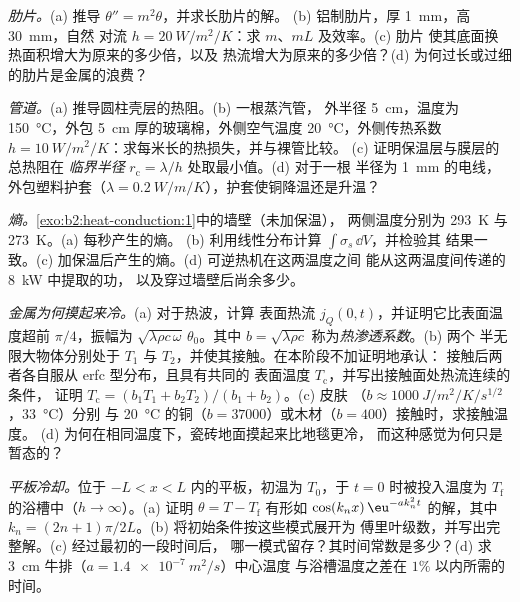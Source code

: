 \begin{exercise}[$\star\star$]\label{exo:b2:heat-conduction:8}
\emph{肋片。}(a) 推导 $\theta'' = m^2\theta$，并求长肋片的解。
(b) 铝制肋片，厚 \qty{1}{mm}，高 \qty{30}{mm}，自然
对流 $h = \qty{20}{W/m^2/K}$：求 $m$、$mL$ 及效率。(c) 肋片
使其底面换热面积增大为原来的多少倍，以及
热流增大为原来的多少倍？(d) 为何过长或过细的肋片是金属的浪费？
\end{exercise}

\begin{exercise}[$\star\star$]\label{exo:b2:heat-conduction:9}
\emph{管道。}(a) 推导圆柱壳层的热阻。(b) 一根蒸汽管，
外半径 \qty{5}{cm}，温度为 \qty{150}{\celsius}，外包
\qty{5}{cm} 厚的玻璃棉，外侧空气温度 \qty{20}{\celsius}，外侧传热系数 $h =
\qty{10}{W/m^2/K}$：求每米长的热损失，并与裸管比较。
(c) 证明保温层与膜层的总热阻在
\emph{临界半径} $r_{\text{c}} = \lambda/h$ 处取最小值。(d) 对于一根
半径为 \qty{1}{mm} 的电线，外包塑料护套（$\lambda =
\qty{0.2}{W/m/K}$），护套使铜降温还是升温？
\end{exercise}

\begin{exercise}[$\star\star\star$]\label{exo:b2:heat-conduction:10}
\emph{熵。}\cref{exo:b2:heat-conduction:1}中的墙壁（未加保温），
两侧温度分别为 \qty{293}{K} 与 \qty{273}{K}。(a) 每秒产生的熵。
(b) 利用线性分布计算 $\int\sigma_s\,\dd V$，并检验其
结果一致。(c) 加保温后产生的熵。(d) 可逆热机在这两温度之间
能从这两温度间传递的 \qty{8}{kW} 中提取的功，
以及穿过墙壁后尚余多少。
\end{exercise}

\begin{exercise}[$\star\star\star$]\label{exo:b2:heat-conduction:11}
\emph{金属为何摸起来冷。}(a) 对于热波，计算
表面热流 $j_Q(0,t)$，并证明它比表面温度超前
$\pi/4$，振幅为 $\sqrt{\lambda\rho c\,\omega}\,\theta_0$。其中
$b = \sqrt{\lambda\rho c}$ 称为\emph{热渗透系数}。(b) 两个
半无限大物体分别处于 $T_1$ 与 $T_2$，并使其接触。在本阶段不加证明地承认：
接触后两者各自服从 erfc 型分布，且具有共同的
表面温度 $T_{\text{c}}$，并写出接触面处热流连续的条件，
证明 $T_{\text{c}} = (b_1T_1 + b_2T_2)/(b_1 + b_2)$。(c) 皮肤
（$b \approx \qty{1000}{J/m^2/K/s^{1/2}}$，\qty{33}{\celsius}）分别
与 \qty{20}{\celsius} 的铜（$b = 37000$）或木材（$b = 400$）接触时，求接触温度。
(d) 为何在相同温度下，瓷砖地面摸起来比地毯更冷，
而这种感觉为何只是暂态的？
\end{exercise}

\begin{exercise}[$\star\star\star$]\label{exo:b2:heat-conduction:12}
\emph{平板冷却。}位于 $-L < x < L$ 内的平板，初温为 $T_0$，于 $t =
0$ 时被投入温度为 $T_{\text{f}}$ 的浴槽中（$h \to \infty$）。(a) 证明 $\theta =
T - T_{\text{f}}$ 有形如 $\cos(k_nx)\,\eu^{-ak_n^2t}$ 的解，其中 $k_n
= (2n+1)\pi/2L$。(b) 将初始条件按这些模式展开为
傅里叶级数，并写出完整解。(c) 经过最初的一段时间后，
哪一模式留存？其时间常数是多少？(d) 求
\qty{3}{cm} 牛排（$a = \qty{1.4e-7}{m^2/s}$）中心温度
与浴槽温度之差在 $1\%$ 以内所需的时间。
\end{exercise}


